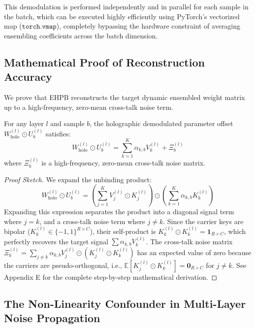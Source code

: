This demodulation is performed independently and in parallel for each sample in the batch, which can be executed highly efficiently using PyTorch's vectorized map ($\mathtt{torch.vmap}$), completely bypassing the hardware constraint of averaging ensembling coefficients across the batch dimension.

\subsection{Mathematical Proof of Reconstruction Accuracy}

We prove that EHPB reconstructs the target dynamic ensembled weight matrix up to a high-frequency, zero-mean cross-talk noise term. 

\begin{theorem}
For any layer $l$ and sample $b$, the holographic demodulated parameter offset $W_{\text{holo}}^{(l)} \odot U_b^{(l)}$ satisfies:
\begin{equation}
W_{\text{holo}}^{(l)} \odot U_b^{(l)} = \sum_{k=1}^K \alpha_{k, b} V_k^{(l)} + \Xi_b^{(l)}
\end{equation}
where $\Xi_b^{(l)}$ is a high-frequency, zero-mean cross-talk noise matrix.
\end{theorem}

\begin{proof}[Proof Sketch]
We expand the unbinding product:
\begin{equation}
W_{\text{holo}}^{(l)} \odot U_b^{(l)} = \left( \sum_{j=1}^K V_j^{(l)} \odot K_j^{(l)} \right) \odot \left( \sum_{k=1}^K \alpha_{k, b} K_k^{(l)} \right)
\end{equation}
Expanding this expression separates the product into a diagonal signal term where $j = k$, and a cross-talk noise term where $j \neq k$. Since the carrier keys are bipolar ($K_k^{(l)} \in \{-1, 1\}^{R \times C}$), their self-product is $K_k^{(l)} \odot K_k^{(l)} = \mathbf{1}_{R \times C}$, which perfectly recovers the target signal $\sum \alpha_{k, b} V_k^{(l)}$. The cross-talk noise matrix $\Xi_b^{(l)} = \sum_{j \neq k} \alpha_{k, b} V_j^{(l)} \odot (K_j^{(l)} \odot K_k^{(l)})$ has an expected value of zero because the carriers are pseudo-orthogonal, i.e., $\mathbb{E}[K_j^{(l)} \odot K_k^{(l)}] = \mathbf{0}_{R \times C}$ for $j \neq k$. See Appendix E for the complete step-by-step mathematical derivation.
\end{proof}

\subsection{The Non-Linearity Confounder in Multi-Layer Noise Propagation}
\label{subsec:non_linearity_confounder}

